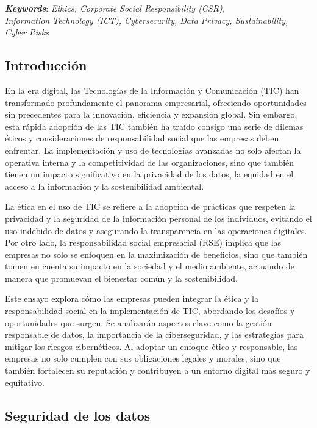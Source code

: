 \documentclass[letterpaper, 12pt]{report}
\newcommand{\bolditalic}[1]{\textbf{\textit{#1}}}
\begin{document}
\bolditalic{Keywords}: \textit{Ethics, Corporate Social Responsibility (CSR), \\ Information Technology (ICT), Cybersecurity, Data Privacy, Sustainability, Cyber Risks}

\noindent\makebox[\linewidth]{\rule{\textwidth}{0.4pt}}

\subsection*{Introducción}

En la era digital, las Tecnologías de la Información y Comunicación (TIC) han
transformado profundamente el panorama empresarial, ofreciendo oportunidades
sin precedentes para la innovación, eficiencia y expansión global. Sin embargo,
esta rápida adopción de las TIC también ha traído consigo una serie de dilemas
éticos y consideraciones de responsabilidad social que las empresas deben
enfrentar. La implementación y uso de tecnologías avanzadas no solo afectan la
operativa interna y la competitividad de las organizaciones, sino que también
tienen un impacto significativo en la privacidad de los datos, la equidad en el
acceso a la información y la sostenibilidad ambiental.

La ética en el uso de TIC se refiere a la adopción de prácticas que respeten la
privacidad y la seguridad de la información personal de los individuos,
evitando el uso indebido de datos y asegurando la transparencia en las
operaciones digitales. Por otro lado, la responsabilidad social empresarial
(RSE) implica que las empresas no solo se enfoquen en la maximización de
beneficios, sino que también tomen en cuenta su impacto en la sociedad y el
medio ambiente, actuando de manera que promuevan el bienestar común y la
sostenibilidad.

Este ensayo explora cómo las empresas pueden integrar la ética y la
responsabilidad social en la implementación de TIC, abordando los desafíos y
oportunidades que surgen. Se analizarán aspectos clave como la gestión
responsable de datos, la importancia de la ciberseguridad, y las estrategias
para mitigar los riesgos cibernéticos. Al adoptar un enfoque ético y
responsable, las empresas no solo cumplen con sus obligaciones legales y
morales, sino que también fortalecen su reputación y contribuyen a un entorno
digital más seguro y equitativo.

\subsection*{Seguridad de los datos}
\end{document}

